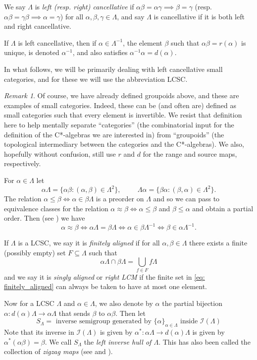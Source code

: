 \documentclass[12pt]{amsart}
\theoremstyle{definition}
\theoremstyle{remark}
\newtheorem{remark}[thm]{Remark}
\numberwithin{equation}{section}
\renewcommand{\L}{\Lambda}
\renewcommand{\a}{\alpha}
\renewcommand{\b}{\beta}
\newcommand{\I}{\mathcal{I}}
\begin{document}
	We say $\L$ is {\em left (resp. right) cancellative} if $\a\b = \a\gamma \implies \b = \gamma$ (resp. $\a\b = \gamma\b \implies \a =\gamma$) for all $\a,\b,\gamma\in \L$, and say $\L$ is cancellative if it is both left and right cancellative. 
	
	If $\L$ is left cancellative, then if $\a\in\L^{-1}$, the element $\b$ such that $\a\b = r(\a)$ is unique, is denoted $\a^{-1}$, and also satisfies $\a^{-1}\a = d(\a)$. 
	
	In what follows, we will be primarily dealing with left cancellative small categories, and for these we will use the abbreviation LCSC.
	
	\begin{remark}
		Of course, we have already defined groupoids above, and these are examples of small categories. Indeed, these can be (and often are) defined as small categories such that every element is invertible. We resist that definition here to help mentally separate ``categories'' (the combinatorial input for the definition of the C*-algebras we are interested in) from ``groupoids'' (the topological intermediary between the categories and the C*-algebras). We also, hopefully without confusion, still use $r$ and $d$ for the range and source maps, respectively.
	\end{remark} 
	
	For $\a\in\L$ let $$\a\L = \{\a\b: (\a,\b)\in\L^2\}, \hspace{1cm}\L\a = \{\b\a:(\b,\a)\in\L^2\}.$$ The relation $\a\leq \b \iff \a\in\b\L$ is a preorder on $\L$ and so we can pass to equivalence classes for the relation $\a\approx \b \iff \a\leq\b$ and $\b\leq\a$ and obtain a partial order.  Then (see \cite{OP23}) we have
	\[
	\a\approx\b\iff \a\L = \b\L\iff \a\in\b\L^{-1}\iff\b\in\a\L^{-1}.
	\]
	
		If $\L$ is a LCSC, we say it is {\em finitely aligned} if for all $\a, \b\in \L$ there exists a finite (possibly empty) set $F\subseteq\L$ such that 
		\begin{equation}\label{eq: finitely_aligned}
		\a\L\cap\b\L = \bigcup_{f\in F}f\L
		\end{equation}
	and we say it is {\em singly aligned} or {\em right LCM} if the finite set in \eqref{eq: finitely_aligned} can always be taken to have at most one element.
	
	  
	
	Now for a LCSC $\L$ and $\a\in \L$, we also denote by $\a$ the partial bijection $\a: d(\a)\L \to \a\L$ that sends $\b$ to $\a\b$. Then let 
		\[
	S_\L = \text{ inverse semigroup generated by }\{\a\}_{\a\in \L}\text{ inside }\I(\L)
	\] 
		 Note that its inverse in $\I(\L)$ is given by $\a^*:\a\L \to d(\a)\L$ is given by $\a^*(\a\b) = \b$. We call $S_\L$ the {\em left inverse hull of $\L$}. This has also been called the collection of {\em zigzag maps} (see \cite{Sp20} and \cite[Lemma~2.14]{OP20}).
		 
\end{document}
